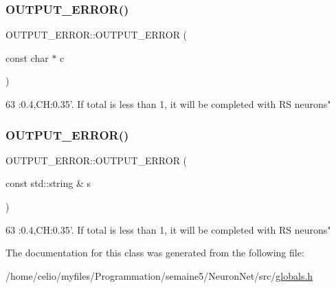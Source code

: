 \subsubsection{\texorpdfstring{O\+U\+T\+P\+U\+T\+\_\+\+E\+R\+R\+O\+R()}{OUTPUT\_ERROR()}\hspace{0.1cm}{\footnotesize\ttfamily [1/2]}}
{\footnotesize\ttfamily O\+U\+T\+P\+U\+T\+\_\+\+E\+R\+R\+O\+R\+::\+O\+U\+T\+P\+U\+T\+\_\+\+E\+R\+R\+OR (\begin{DoxyParamCaption}\item[{const char $\ast$}]{c }\end{DoxyParamCaption})\hspace{0.3cm}{\ttfamily [inline]}}


\begin{DoxyCode}
63 :0.4,CH:0.35\textcolor{stringliteral}{'. If total is less than 1, it will be completed with RS neurons"}
\end{DoxyCode}
\mbox{\label{classOUTPUT__ERROR_abdf8edc6e3ea161cc5fac3bf6baffae1}} 
\subsubsection{\texorpdfstring{O\+U\+T\+P\+U\+T\+\_\+\+E\+R\+R\+O\+R()}{OUTPUT\_ERROR()}\hspace{0.1cm}{\footnotesize\ttfamily [2/2]}}
{\footnotesize\ttfamily O\+U\+T\+P\+U\+T\+\_\+\+E\+R\+R\+O\+R\+::\+O\+U\+T\+P\+U\+T\+\_\+\+E\+R\+R\+OR (\begin{DoxyParamCaption}\item[{const std\+::string \&}]{s }\end{DoxyParamCaption})\hspace{0.3cm}{\ttfamily [inline]}}


\begin{DoxyCode}
63 :0.4,CH:0.35\textcolor{stringliteral}{'. If total is less than 1, it will be completed with RS neurons"}
\end{DoxyCode}


The documentation for this class was generated from the following file\+:\begin{DoxyCompactItemize}
\item 
/home/celio/myfiles/\+Programmation/semaine5/\+Neuron\+Net/src/\hyperlink{globals_8h}{globals.\+h}\end{DoxyCompactItemize}
